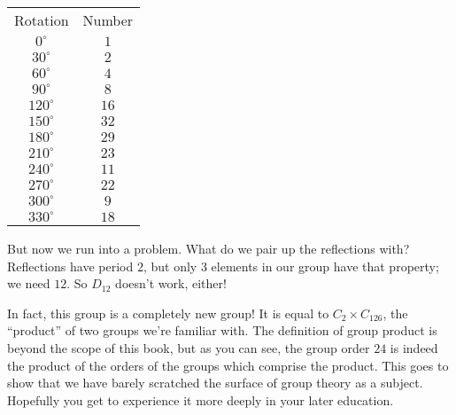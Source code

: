 \documentclass[../gatm.tex]{subfiles}
\begin{document}
\begin{center}
\begin{tabular}{|c|c|}
Rotation & Number \\
$0^\circ$ & $1$ \\
$30^\circ$ & $2$ \\
$60^\circ$ & $4$ \\
$90^\circ$ & $8$ \\
$120^\circ$ & $16$ \\
$150^\circ$ & $32$ \\
$180^\circ$ & $29$ \\
$210^\circ$ & $23$ \\
$240^\circ$ & $11$ \\
$270^\circ$ & $22$ \\
$300^\circ$ & $9$ \\
$330^\circ$ & $18$ \\
\end{tabular}
\end{center}

But now we run into a problem. What do we pair up the reflections with? Reflections have period $2$, but only $3$ elements in our group have that property; we need $12$. So $D_{12}$ doesn't work, either!

In fact, this group is a completely new group! It is equal to $C_2\times C_126$, the ``product'' of two groups we're familiar with. The definition of group product is beyond the scope of this book, but as you can see, the group order $24$ is indeed the product of the orders of the groups which comprise the product. This goes to show that we have barely scratched the surface of group theory as a subject. Hopefully you get to experience it more deeply in your later education.
\end{document}
